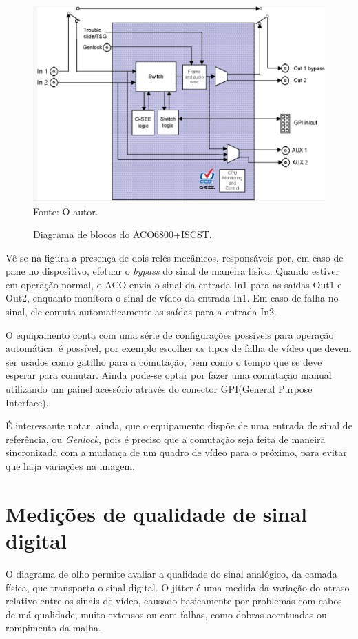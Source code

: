 \documentclass[
	12pt,				%
	oneside,			%
	a4paper,			%
	brazil
	]{abntex2}
\begin{document}
\begin{figure}[!h]
\centering
\caption{Diagrama de blocos do ACO6800+ISCST.}
\includegraphics[width=0.5\linewidth]{figuras/aco_block_diag.png}
\\Fonte: O autor.
\label{fig:aco_block_diag}
\end{figure}

Vê-se na figura a presença de dois relés mecânicos, responsáveis por, em caso de pane no dispositivo, efetuar o \textit{bypass} do sinal de maneira física. Quando estiver em operação normal, o ACO envia o sinal da entrada In1 para as saídas Out1 e Out2, enquanto monitora o sinal de vídeo da entrada In1. Em caso de falha no sinal, ele comuta automaticamente as saídas para a entrada In2.

O equipamento conta com uma série de configurações possíveis para operação automática: é possível, por exemplo escolher os tipos de falha de vídeo que devem ser usados como gatilho para a comutação, bem como o tempo que se deve esperar para comutar. Ainda pode-se optar por fazer uma comutação manual utilizando um painel acessório através do conector GPI(General Purpose Interface).

É interessante notar, ainda, que o equipamento dispõe de uma entrada de sinal de referência, ou \textit{Genlock}, pois é preciso que a comutação seja feita de maneira sincronizada com a mudança de um quadro de vídeo para o próximo, para evitar que haja variações na imagem.

\section{Medições de qualidade de sinal digital}

O diagrama de olho permite avaliar a qualidade do sinal analógico, da camada física, que transporta o sinal digital. O jitter é uma medida da variação do atraso relativo entre os sinais de vídeo, causado basicamente por problemas com cabos de má qualidade, muito extensos ou com falhas, como dobras acentuadas ou rompimento da malha.
\end{document}
